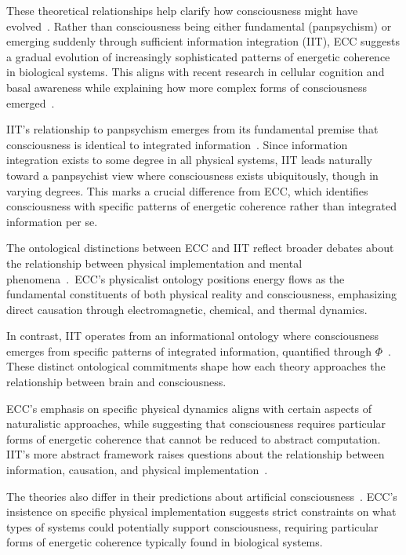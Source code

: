 These theoretical relationships help clarify how consciousness might have evolved~\cite{Goff2019, Thompson2018}. Rather than consciousness being either fundamental (panpsychism) or emerging suddenly through sufficient information integration (IIT), ECC suggests a gradual evolution of increasingly sophisticated patterns of energetic coherence in biological systems. This aligns with recent research in cellular cognition and basal awareness while explaining how more complex forms of consciousness emerged~\cite{Mathews2011, lyon2021reframing}.

IIT's relationship to panpsychism emerges from its fundamental premise that consciousness is identical to integrated information~\cite{Tononi2016, Koch2019}. Since information integration exists to some degree in all physical systems, IIT leads naturally toward a panpsychist view where consciousness exists ubiquitously, though in varying degrees. This marks a crucial difference from ECC, which identifies consciousness with specific patterns of energetic coherence rather than integrated information per se.

The ontological distinctions between ECC and IIT reflect broader debates about the relationship between physical implementation and mental phenomena~\cite{Nagel1979, Chalmers2018}.~ECC's physicalist ontology positions energy flows as the fundamental constituents of both physical reality and consciousness, emphasizing direct causation through electromagnetic, chemical, and thermal dynamics. 

In contrast, IIT operates from an informational ontology where consciousness emerges from specific patterns of integrated information, quantified through $\Phi$~\cite{Oizumi2014, Tononi2021}. These distinct ontological commitments shape how each theory approaches the relationship between brain and consciousness.

ECC's emphasis on specific physical dynamics aligns with certain aspects of naturalistic approaches, while suggesting that consciousness requires particular forms of energetic coherence that cannot be reduced to abstract computation. IIT's more abstract framework raises questions about the relationship between information, causation, and physical implementation~\cite{Tononi2015, Koch2019}.

The theories also differ in their predictions about artificial consciousness~\cite{Koch2019, seth2024conscious}. ECC's insistence on specific physical implementation suggests strict constraints on what types of systems could potentially support consciousness, requiring particular forms of energetic coherence typically found in biological systems. 

